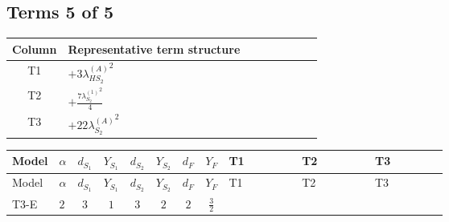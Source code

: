 \documentclass[8pt]{article}
\begin{document}
\begin{landscape}
\subsection*{Terms 5 of 5}
\begin{center}
\begin{tabular}{@{}c >{\raggedright\arraybackslash}p{0.82\linewidth}@{}}
\toprule
Column & Representative term structure \\
\midrule
T1 & \(\displaystyle +3 {\lambda_{HS_2}^{(A)}}^2\) \\
\midrule
T2 & \(\displaystyle +\frac{7 {\lambda_{S_2}^{(1)}}^2}{4}\) \\
\midrule
T3 & \(\displaystyle +22 {\lambda_{S_2}^{(A)}}^2\) \\
\midrule
\bottomrule
\end{tabular}
\end{center}
\smallskip
\tiny
\begin{longtable}{@{}llcccccc >{\raggedright\arraybackslash}p{0.21\linewidth} >{\raggedright\arraybackslash}p{0.21\linewidth} >{\raggedright\arraybackslash}p{0.21\linewidth}@{}}
\toprule
Model & $\alpha$ & $d_{S_1}$ & $Y_{S_1}$ & $d_{S_2}$ & $Y_{S_2}$ & $d_F$ & $Y_F$ & T1 & T2 & T3 \\
\midrule
\endfirsthead
\toprule
Model & $\alpha$ & $d_{S_1}$ & $Y_{S_1}$ & $d_{S_2}$ & $Y_{S_2}$ & $d_F$ & $Y_F$ & T1 & T2 & T3 \\
\midrule
\endhead
T3-E & $2$ & $3$ & $1$ & $3$ & $2$ & $2$ & $\frac{3}{2}$ & \scriptsize\adjustbox{max width=\linewidth}{$\begin{gathered} +3 {\lambda_{HS_2}^{(A)}}^2\end{gathered}$} & \scriptsize\adjustbox{max width=\linewidth}{$\begin{gathered} +\frac{7 {\lambda_{S_2}^{(1)}}^2}{4}\end{gathered}$} & \scriptsize\adjustbox{max width=\linewidth}{$\begin{gathered} +22 {\lambda_{S_2}^{(A)}}^2\end{gathered}$} \\
\midrule
\bottomrule
\end{longtable}
\end{landscape}
\end{document}

